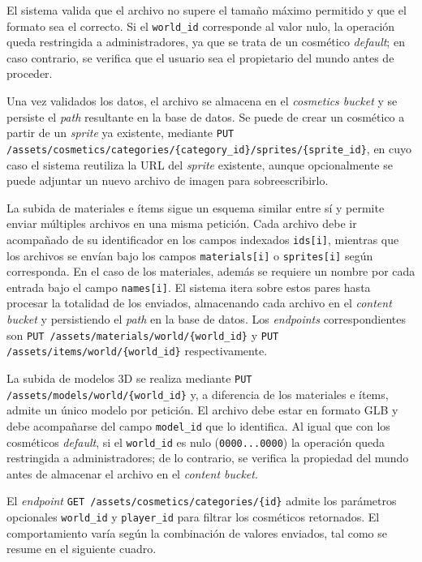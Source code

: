 El sistema valida que el archivo no supere el tamaño máximo permitido y que el formato sea el correcto. Si el \texttt{world\_id} 
corresponde al valor nulo, la operación queda restringida a administradores, ya que se trata de un cosmético \textit{default}; 
en caso contrario, se verifica que el usuario sea el propietario del mundo antes de proceder. 
\vspace{0.25cm}

Una vez validados los datos, el archivo se almacena en el \textit{cosmetics bucket} y se persiste el \textit{path} resultante 
en la base de datos. Se puede de crear un cosmético a partir de un \textit{sprite} ya existente, mediante
\texttt{PUT /assets/cosmetics/categories/\{category\_id\}/sprites/\{sprite\_id\}}, en cuyo caso el sistema reutiliza
la URL del \textit{sprite} existente, aunque opcionalmente se puede adjuntar un nuevo archivo de imagen para sobreescribirlo.
\vspace{0.25cm}

La subida de materiales e ítems sigue un esquema similar entre sí y permite enviar múltiples archivos en una misma
petición. Cada archivo debe ir acompañado de su identificador en los campos indexados \texttt{ids[i]}, mientras que
los archivos se envían bajo los campos \texttt{materials[i]} o \texttt{sprites[i]} según corresponda. En el caso de
los materiales, además se requiere un nombre por cada entrada bajo el campo \texttt{names[i]}. El sistema itera sobre
estos pares hasta procesar la totalidad de los enviados, almacenando cada archivo en el \textit{content bucket} y
persistiendo el \textit{path} en la base de datos. Los \textit{endpoints} correspondientes son
\texttt{PUT /assets/materials/world/\{world\_id\}} y \texttt{PUT /assets/items/world/\{world\_id\}} respectivamente.
\vspace{0.25cm}

La subida de modelos 3D se realiza mediante \texttt{PUT /assets/models/world/\{world\_id\}} y, a diferencia de los
materiales e ítems, admite un único modelo por petición. El archivo debe estar en formato GLB y debe acompañarse del
campo \texttt{model\_id} que lo identifica. Al igual que con los cosméticos \textit{default}, si el \texttt{world\_id} es
nulo (\texttt{0000...0000}) la operación queda restringida a administradores; de lo contrario, se verifica la propiedad del mundo antes
de almacenar el archivo en el \textit{content bucket}.
\vspace{0.25cm}

El \textit{endpoint} \texttt{GET /assets/cosmetics/categories/\{id\}} admite los parámetros opcionales
\texttt{world\_id} y \texttt{player\_id} para filtrar los cosméticos retornados. El comportamiento varía según
la combinación de valores enviados, tal como se resume en el siguiente cuadro.
\vspace{0.25cm}

